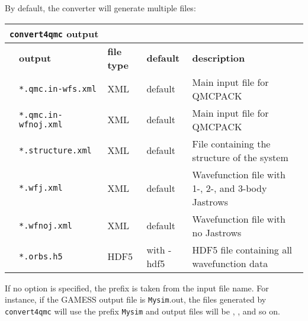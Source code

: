 By default, the converter will generate multiple files:\\
\begin{table}[h]
\begin{center}
\begin{tabularx}{\textwidth}{l l l l X }
\hline
\multicolumn{5}{l}{\texttt{convert4qmc} output} \\
\hline
   &   \bfseries output     & \bfseries file type & \bfseries default   & \bfseries description \\
   &   \texttt{*.qmc.in-wfs.xml             } &  XML  & default& Main input file for QMCPACK\\
   &   \texttt{*.qmc.in-wfnoj.xml             } &  XML  & default& Main input file for QMCPACK\\
   &   \texttt{*.structure.xml             } &  XML   &default   & File containing the structure of the system\\
   &   \texttt{*.wfj.xml             } &  XML  & default & Wavefunction file with 1-, 2-, and 3-body Jastrows\\
   &   \texttt{*.wfnoj.xml             } &  XML   & default & Wavefunction file with no Jastrows \\
   &   \texttt{*.orbs.h5             } &  HDF5   & with -hdf5   & HDF5 file containing all wavefunction data\\
    \hline
    \end{tabularx}
\end{center}
\end{table}

If no  option is specified, the prefix is taken from
the input file name. For instance, if the GAMESS output file is
\texttt{Mysim}.out, the files generated by \texttt{convert4qmc} will use the
prefix \texttt{Mysim} and output files will be
, , and so on.

